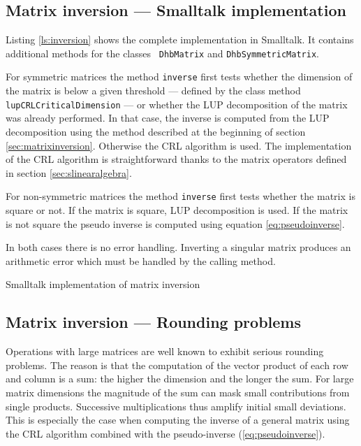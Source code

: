 \documentclass[twoside]{book}
\begin{document}
\subsection{Matrix inversion --- Smalltalk implementation}
Listing \ref{ls:inversion} shows the complete implementation in
Smalltalk. It contains additional methods for the classes {\tt
DhbMatrix} and {\tt DhbSymmetricMatrix}.

For symmetric matrices the method {\tt inverse} first tests
whether the dimension of the matrix is below a given threshold ---
defined by the class method {\tt lupCRLCriticalDimension} --- or
whether the LUP decomposition of the matrix was already performed.
In that case, the inverse is computed from the LUP decomposition
using the method described at the beginning of section
\ref{sec:matrixinversion}. Otherwise the CRL algorithm is used.
The implementation of the CRL algorithm is straightforward thanks
to the matrix operators defined in section
\ref{sec:slinearalgebra}.

For non-symmetric matrices the method {\tt inverse} first tests
whether the matrix is square or not. If the matrix is square, LUP
decomposition is used. If the matrix is not square the pseudo
inverse is computed using equation \ref{eq:pseudoinverse}.

In both cases there is no error handling. Inverting a singular
matrix produces an arithmetic error which must be handled by the
calling method.

\begin{listing} Smalltalk implementation of matrix inversion \label{ls:inversion}


\end{listing}


\subsection{Matrix inversion --- Rounding problems}
\label{sec:matrixrounding} Operations with large matrices are well
known to exhibit serious rounding problems. The reason is that the
computation of the vector product of each row and column is a sum:
the higher the dimension and the longer the sum. For large matrix
dimensions the magnitude of the sum can mask small contributions
from single products. Successive multiplications thus amplify
initial small deviations. This is especially the case when
computing the inverse of a general matrix using the CRL algorithm
combined with the pseudo-inverse (\ref{eq:pseudoinverse}).
\end{document}
